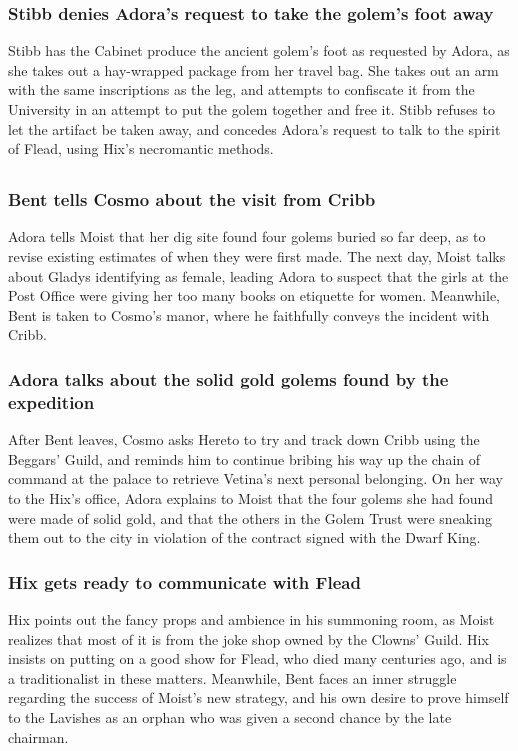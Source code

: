 \subsubsection{\Gls{Stibb} denies \Gls{Adora}'s request to take the golem's foot away}
\Gls{Stibb} has the Cabinet produce the ancient golem's foot as requested by \Gls{Adora}, as she
takes out a hay-wrapped package from her travel bag. She takes out an arm with the same inscriptions
as the leg, and attempts to confiscate it from the University in an attempt to put the golem
together and free it. \Gls{Stibb} refuses to let the artifact be taken away, and concedes
\Gls{Adora}'s request to talk to the spirit of \Gls{Flead}, using \Gls{Hix}'s necromantic methods.

\subsection{}
\subsubsection{\Gls{Bent} tells \Gls{Cosmo} about the visit from \Gls{Cribb}}
\Gls{Adora} tells \Gls{Moist} that her dig site found four golems buried so far deep, as to revise
existing estimates of when they were first made. The next day, \Gls{Moist} talks about \Gls{Gladys}
identifying as female, leading \Gls{Adora} to suspect that the girls at the Post Office were
giving her too many books on etiquette for women. Meanwhile, \Gls{Bent} is taken to \Gls{Cosmo}'s
manor, where he faithfully conveys the incident with \Gls{Cribb}.

\subsubsection{\Gls{Adora} talks about the solid gold golems found by the expedition}
After \Gls{Bent} leaves, \Gls{Cosmo} asks \Gls{Hereto} to try and track down \Gls{Cribb} using the
Beggars' Guild, and reminds him to continue bribing his way up the chain of command at the palace to
retrieve \Gls{Vetina}'s next personal belonging. On her way to the \Gls{Hix}'s office, \Gls{Adora}
explains to \Gls{Moist} that the four golems she had found were made of solid gold, and that the
others in the Golem Trust were sneaking them out to the city in violation of the contract signed
with the Dwarf King.

\subsubsection{\Gls{Hix} gets ready to communicate with \Gls{Flead}}
\Gls{Hix} points out the fancy props and ambience in his summoning room, as \Gls{Moist} realizes
that most of it is from the joke shop owned by the Clowns' Guild. \Gls{Hix} insists on putting on
a good show for \Gls{Flead}, who died many centuries ago, and is a traditionalist in these matters.
Meanwhile, \Gls{Bent} faces an inner struggle regarding the success of \Gls{Moist}'s new strategy,
and his own desire to prove himself to the Lavishes as an orphan who was given a second chance by
the late chairman.

